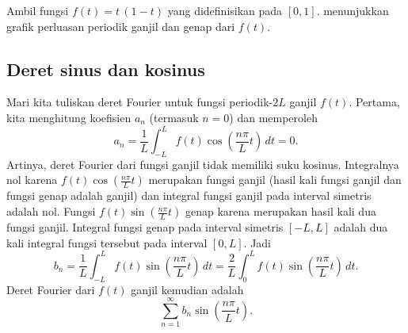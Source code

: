 \begin{example}
Ambil fungsi $f(t) = t\,(1-t)$ yang didefinisikan pada $[0,1]$. 
menunjukkan grafik perluasan periodik ganjil dan genap dari $f(t)$.

\begin{myfig}
\capstart
\caption{Perluasan periodik-2 ganjil dan genap dari $f(t) =
t\,(1-t)$, $0 \leq t \leq 1$.\label{scs:oddevenextfig}}
\end{myfig}
\end{example}

\subsection{Deret sinus dan kosinus}

Mari kita tuliskan deret Fourier untuk
fungsi periodik-$2L$ ganjil $f(t)$.
Pertama, kita menghitung koefisien $a_n$ (termasuk
$n=0$) dan memperoleh
\begin{equation*}
a_n = \frac{1}{L} \int_{-L}^L f(t) \cos \left( \frac{n \pi}{L} t \right)
\, dt = 0 .
\end{equation*}
Artinya, deret Fourier dari fungsi ganjil tidak memiliki suku kosinus.
Integralnya nol
karena $f(t) \cos \left( \frac{n \pi}{L} t \right)$
merupakan fungsi ganjil (hasil kali fungsi ganjil dan
fungsi genap adalah ganjil) dan integral fungsi ganjil pada interval
simetris adalah nol.
Fungsi $f(t) \sin \left( \frac{n \pi}{L} t \right)$ genap
karena merupakan hasil kali dua
fungsi ganjil.
Integral fungsi genap pada interval simetris
$[-L,L]$ adalah dua kali integral fungsi tersebut pada interval $[0,L]$.
Jadi
\begin{equation*}
b_n = 
\frac{1}{L} \int_{-L}^L f(t) \sin \left( \frac{n \pi}{L} t \right) \, dt =
\frac{2}{L} \int_{0}^L f(t) \sin \left( \frac{n \pi}{L} t \right) \, dt .
\end{equation*}
Deret Fourier dari $f(t)$ ganjil kemudian adalah
\begin{equation*}
\sum_{n=1}^\infty b_n \sin \left( \frac{n \pi}{L} t \right) .
\end{equation*}

